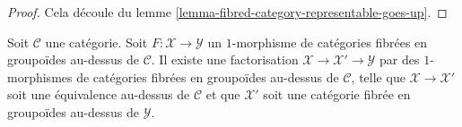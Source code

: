 \begin{proof}
Cela découle du
lemme \ref{lemma-fibred-category-representable-goes-up}.
\end{proof}

\begin{lemma}
\label{lemma-ameliorate-morphism-categories-fibred-groupoids}
Soit $\mathcal{C}$ une catégorie. Soit $F : \mathcal{X} \to \mathcal{Y}$
un $1$-morphisme de catégories fibrées en groupoïdes au-dessus de $\mathcal{C}$.
Il existe une factorisation $\mathcal{X} \to \mathcal{X}' \to \mathcal{Y}$
par des $1$-morphismes de catégories fibrées en groupoïdes au-dessus de $\mathcal{C}$,
telle que $\mathcal{X} \to \mathcal{X}'$ soit une équivalence au-dessus de $\mathcal{C}$
et que $\mathcal{X}'$ soit une catégorie fibrée en groupoïdes au-dessus de
$\mathcal{Y}$.
\end{lemma}

